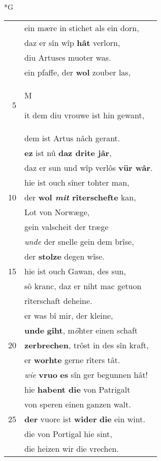 \documentclass[8pt,a4paper,notitlepage]{article}
\begin{document}
\newpage
\begin{table}[ht]
\begin{minipage}[t]{0.5\linewidth}
\small
\begin{center}*G
\end{center}
\begin{tabular}{rl}
 & ein mære in stichet als ein dorn,\\ 
 & daz er sîn wîp \textbf{hât} verlorn,\\ 
 & diu Artuses muoter was.\\ 
 & ein pfaffe, der \textbf{wol} zouber las,\\ 
5 & \begin{large}M\end{large}it dem diu vrouwe ist hin gewant,\\ 
 & dem ist Artus nâch gerant.\\ 
 & \textbf{ez} ist nû \textbf{daz drite jâr},\\ 
 & daz er sun und wîp verlôs \textbf{vür wâr}.\\ 
 & hie ist ouch sîner tohter man,\\ 
10 & der \textbf{wol \textit{mit} rîterschefte} kan,\\ 
 & Lot von Norwæge,\\ 
 & gein valscheit der træge\\ 
 & \textit{unde} der snelle gein dem brîse,\\ 
 & der \textbf{stolze} degen wîse.\\ 
15 & hie ist ouch Gawan, des sun,\\ 
 & sô kranc, daz er niht mac getuon\\ 
 & rîterschaft deheine.\\ 
 & er was bî mir, der kleine,\\ 
 & \textbf{unde} \textbf{giht}, m\textit{ö}hter einen schaft\\ 
20 & \textbf{zerbrechen}, trôst in des sîn kraft,\\ 
 & er \textbf{worhte} gerne rîters tât.\\ 
 & \textit{wie} \textbf{vruo} \textbf{es} sîn ger begunnen hât!\\ 
 & hie \textbf{habent die} von Patrigalt\\ 
 & von speren einen ganzen walt.\\ 
25 & \textbf{der} vuore ist \textbf{wider} \textbf{die} ein wint.\\ 
 & die von Portigal hie sint,\\ 
 & die heizen wir die vrechen.\\ 

\end{tabular}
\end{minipage}
\end{table}
\end{document}
